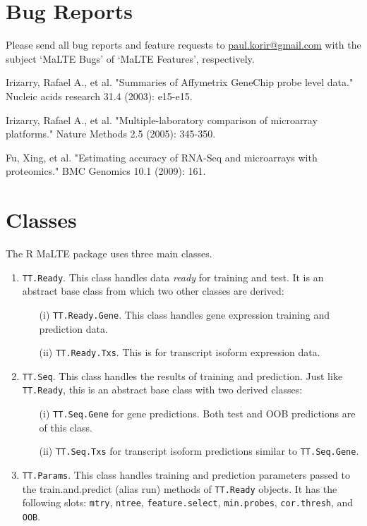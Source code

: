 \documentclass[a4paper,12pt]{article}
\begin{document}
\section{Bug Reports}
\label{bugs}
Please send all bug reports and feature requests to \href{mailto:paul.korir@gmail.com}{paul.korir@gmail.com} with the subject `MaLTE Bugs' of `MaLTE Features', respectively.


\begin{thebibliography}{50}

 Irizarry, Rafael A., et al. "Summaries of Affymetrix GeneChip probe level data." Nucleic acids research 31.4 (2003): e15-e15.

 Irizarry, Rafael A., et al. "Multiple-laboratory comparison of microarray platforms." Nature Methods 2.5 (2005): 345-350.

 Fu, Xing, et al. "Estimating accuracy of RNA-Seq and microarrays with proteomics." BMC Genomics 10.1 (2009): 161.

\end{thebibliography}


\pagebreak
\appendix
\section{Classes}
\label{classes}
The \textsf{R} \textsf{MaLTE} package uses three main classes.
\begin{enumerate}
\item \texttt{TT.Ready}. This class handles data \textit{ready} for training and test. It is an abstract base class from which two other classes are derived:
\begin{enumerate}
\item[(i)] \texttt{TT.Ready.Gene}. This class handles gene expression training and prediction data.
\item[(ii)] \texttt{TT.Ready.Txs}. This is for transcript isoform expression data.
\end{enumerate}

\item \texttt{TT.Seq}. This class handles the results of training and prediction. Just like \texttt{TT.Ready}, this is an abstract base class with two derived classes:
\begin{enumerate}
\item[(i)] \texttt{TT.Seq.Gene} for gene predictions. Both test and OOB predictions are of this class.
\item[(ii)] \texttt{TT.Seq.Txs} for transcript isoform predictions similar to \texttt{TT.Seq.Gene}.
\end{enumerate}

\item \texttt{TT.Params}. This class handles training and prediction parameters passed to the train.and.predict (alias run) methods of \texttt{TT.Ready} objects. It has the following slots: \texttt{mtry}, \texttt{ntree}, \texttt{feature.select}, \texttt{min.probes}, \texttt{cor.thresh}, and \texttt{OOB}.
\end{enumerate}
\end{document}
